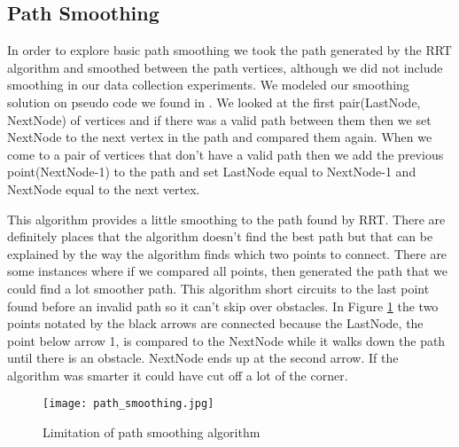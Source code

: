\documentclass[12pt,journal,compsoc]{IEEEtran}
\begin{document}
\subsection{Path Smoothing}
In order to explore basic path smoothing we took the path generated by the RRT algorithm and smoothed between the path vertices, although we did not include smoothing in our data collection experiments. We modeled our smoothing solution on pseudo code we found in \cite{jarvis}. We looked at the first pair(LastNode, NextNode) of vertices and if there was a valid path between them then we set NextNode to the next vertex in the path and compared them again.  When we come to a pair of vertices that don't have a valid path then we add the previous point(NextNode-1) to the path and set LastNode equal to NextNode-1 and NextNode equal to the next vertex.  
\par
This algorithm provides a little smoothing to the path found by RRT.  There are definitely places that the algorithm doesn't find the best path but that can be explained by the way the algorithm finds which two points to connect.   There are some instances where if we compared all points, then generated the path that we could find a lot smoother path.  This algorithm short circuits to the last point found before an invalid path so it can't skip over obstacles.  In Figure \ref{fig:smoothing} the two points notated by the black arrows are connected because the LastNode, the point below arrow 1, is compared to the NextNode while it walks down the path until there is an obstacle.  NextNode ends up at the second arrow.  If the algorithm was smarter it could have cut off a lot of the corner.

\begin{figure}[ht]
\centering
{\texttt{[image: path\_smoothing.jpg]}}
\caption{Limitation of path smoothing algorithm}\label{fig:smoothing}
\end{figure}

\end{document}
